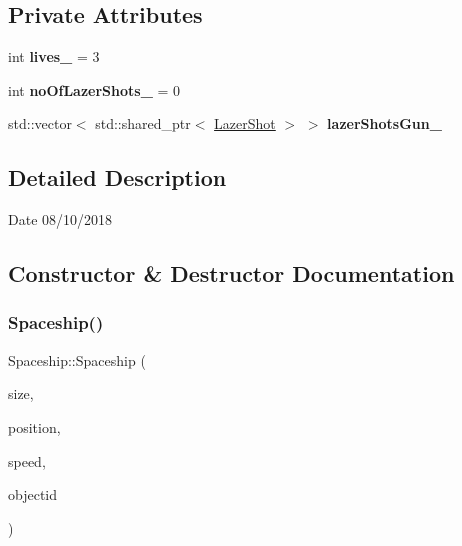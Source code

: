 \subsection*{Private Attributes}
\begin{DoxyCompactItemize}
\item 
\mbox{\label{class_spaceship_ac8fad23e2d21d360fbbcd3f13a650a6e}} 
int {\bfseries lives\+\_\+} = 3
\item 
\mbox{\label{class_spaceship_ae2d6c0ce59cd20a0445c02686a3e8b16}} 
int {\bfseries no\+Of\+Lazer\+Shots\+\_\+} = 0
\item 
\mbox{\label{class_spaceship_a1ab5797ea77593a72c11e4825e000856}} 
std\+::vector$<$ std\+::shared\+\_\+ptr$<$ \mbox{\hyperlink{class_lazer_shot}{Lazer\+Shot}} $>$ $>$ {\bfseries lazer\+Shots\+Gun\+\_\+}
\end{DoxyCompactItemize}


\subsection{Detailed Description}
\begin{DoxyDate}{Date}
08/10/2018 
\end{DoxyDate}


\subsection{Constructor \& Destructor Documentation}
\mbox{\label{class_spaceship_a3fe713cbac3c0c20c298ab1d1aa13a71}} 
\subsubsection{\texorpdfstring{Spaceship()}{Spaceship()}}
{\footnotesize\ttfamily Spaceship\+::\+Spaceship (\begin{DoxyParamCaption}\item[{const \mbox{\hyperlink{classvector2_d}{vector2D}} \&}]{size,  }\item[{const \mbox{\hyperlink{classvector2_d}{vector2D}} \&}]{position,  }\item[{float}]{speed,  }\item[{Object\+ID}]{objectid }\end{DoxyParamCaption})\hspace{0.3cm}{\ttfamily [inline]}}



